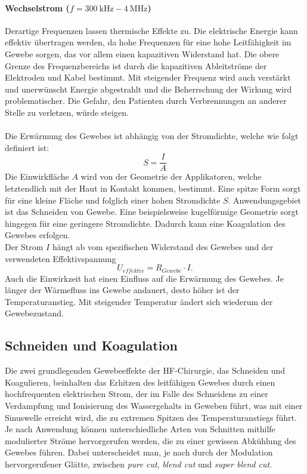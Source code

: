 \documentclass[letterpaper,12pt]{article}
\begin{document}
			\paragraph{Wechselstrom ($f=\SI{300}{\kilo\hertz}-\SI{4}{\mega\hertz}$)}
			Derartige Frequenzen lassen thermische Effekte zu. Die elektrische Energie kann effektiv übertragen werden, da hohe Frequenzen für eine hohe Leitfähigkeit im Gewebe sorgen, das vor allem einen kapazitiven Widerstand hat. Die obere Grenze des Frequenzbereichs ist durch die kapazitiven Ableitströme der Elektroden und Kabel bestimmt. Mit steigender Frequenz wird auch verstärkt und unerwünscht Energie abgestrahlt und die Beherrschung der Wirkung wird problematischer. Die Gefahr, den Patienten durch Verbrennungen an anderer Stelle zu verletzen, würde steigen.\\\\	
			Die Erwärmung des Gewebes ist abhängig von der Stromdichte, welche wie folgt definiert ist:
			\begin{equation} \label{eq:stromdichte}
				S=\frac{I}{A}
			\end{equation}
			Die Einwirkfläche $A$ wird von der Geometrie der Applikatoren, welche letztendlich mit der Haut in Kontakt kommen, bestimmt. Eine spitze Form sorgt für eine kleine Fläche und folglich einer hohen Stromdichte $S$. Anwendungsgebiet ist das Schneiden von Gewebe. Eine beispielsweise kugelförmige Geometrie sorgt hingegen für eine geringere Stromdichte. Dadurch kann eine Koagulation des Gewebes erfolgen.\\Der Strom $I$ hängt ab vom spezifischen Widerstand des Gewebes und der verwendeten Effektivspannung
			\begin{equation} \label{eq:effektivspannung}
			U_{effektiv}=R_{Gewebe} \cdot I.
			\end{equation}
			Auch die Einwirkzeit hat einen Einfluss auf die Erwärmung des Gewebes. Je länger der Wärmefluss ins Gewebe andauert, desto höher ist der Temperaturanstieg. Mit steigender Temperatur ändert sich wiederum der Gewebezustand.
		
		\subsection{Schneiden und Koagulation}
		
			Die zwei grundlegenden Gewebeeffekte der HF-Chirurgie, das Schneiden und Koagulieren, beinhalten das Erhitzen des leitfähigen Gewebes durch einen hochfrequenten elektrischen Strom, der im Falle des Schneidens zu einer Verdampfung und Ionisierung des Wassergehalts in Geweben führt, was mit einer Sinuswelle erreicht wird, die zu extremen Spitzen des Temperaturanstiegs führt. Je nach Anwendung können unterschiedliche Arten von Schnitten mithilfe modulierter Ströme hervorgerufen werden, die zu einer gewissen Abkühlung des Gewebes führen. Dabei unterscheidet man, je nach durch der Modulation hervorgerufener Glätte, zwischen \emph{pure cut}, \emph{blend cut} und \emph{super blend cut}.
			
\end{document}
